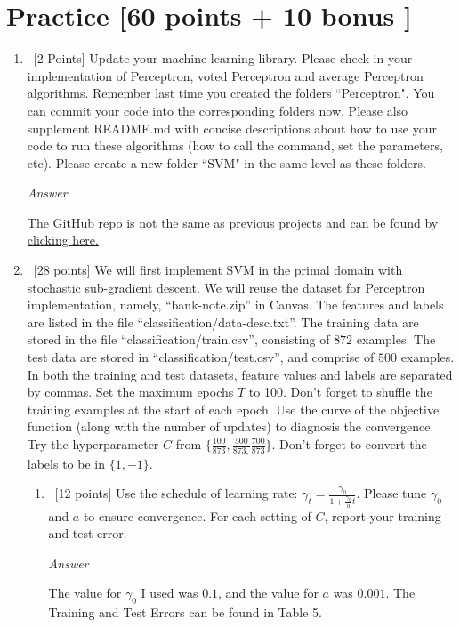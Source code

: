 \documentclass[12pt, fullpage,letterpaper]{article}
\begin{document}
\section{Practice [60 points + 10 bonus ]}
\begin{enumerate}
	\item~[2 Points] Update your machine learning library. Please check in your implementation of Perceptron, voted Perceptron and average Perceptron algorithms. Remember last time you created the folders ``Perceptron". You can commit your code into the corresponding folders now. Please also supplement README.md with concise descriptions about how to use your code to run these algorithms (how to call the command, set the parameters, etc). Please create a new folder ``SVM" in the same level as these folders.  
	
	\emph{Answer}
	
	\href{https://github.com/Paul-Wissler/cs-6350-hw4}{The GitHub repo is not the same as previous projects and can be found by clicking here.}

	\item~[28 points] We will first implement SVM in the primal domain with stochastic sub-gradient descent. We will reuse the  dataset for Perceptron implementation, namely, ``bank-note.zip'' in Canvas. The features and labels are listed in the file ``classification/data-desc.txt''. The training data are stored in the file ``classification/train.csv'', consisting of $872$ examples. The test data are stored in ``classification/test.csv'', and comprise of $500$ examples. In both the training and test datasets, feature values and labels are separated by commas. Set the maximum epochs $T$ to 100. Don't forget to shuffle the training examples at the start of each epoch. Use the curve of the objective function (along with the number of updates) to diagnosis the convergence. Try the hyperparameter $C$ from $\{ \frac{100}{873}, \frac{500}{873,} \frac{700}{873}\}$. Don't forget to convert the labels to be in $\{1, -1\}$.  
	\begin{enumerate}
		\item~[12 points] Use the schedule of learning rate: $\gamma_t = \frac{\gamma_0}{1+\frac{\gamma_0}{a}t}	$. Please tune $\gamma_0$ and $a$ to ensure convergence. For each setting of $C$, report your training and test error. 
		
		\emph{Answer}
		
		The value for $\gamma_0$ I used was $0.1$, and the value for $a$ was $0.001$. The Training and Test Errors can be found in Table 5.
		

\end{enumerate}
\end{enumerate}
\end{document}
